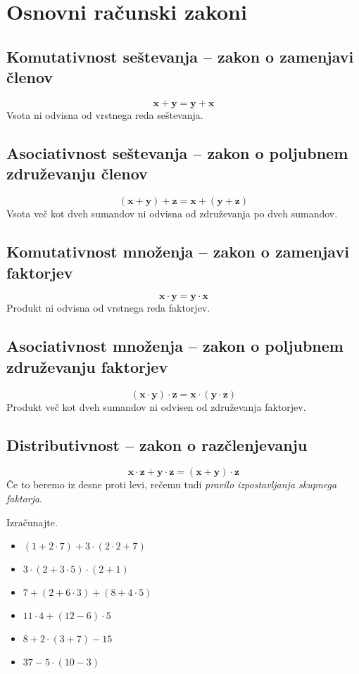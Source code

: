  

 
     \section{Osnovni računski zakoni}

     \subsection*{Komutativnost seštevanja -- zakon o zamenjavi členov}
        $$ \mathbf{x+y=y+x}$$
        Vsota ni odvisna od vrstnega reda seštevanja.
     

        \subsection*{Asociativnost seštevanja -- zakon o poljubnem združevanju členov}
        $$ \mathbf{(x+y)+z=x+(y+z)}$$
        Vsota več kot dveh sumandov ni odvisna od združevanja po dveh sumandov.
     

        \subsection*{Komutativnost množenja -- zakon o zamenjavi faktorjev}
        $$ \mathbf{x\cdot y=y\cdot x}$$
        Produkt ni odvisna od vrstnega reda faktorjev.
     

        \subsection*{Asociativnost množenja -- zakon o poljubnem združevanju faktorjev}
        $$ \mathbf{(x\cdot y)\cdot z=x\cdot (y\cdot z)}$$
        Produkt več kot dveh sumandov ni odvisen od združevanja faktorjev.
     
        \subsection*{Distributivnost -- zakon o razčlenjevanju}
        $$ \mathbf{x\cdot z+y\cdot z = (x+y)\cdot z} $$
        Če to beremo iz desne proti levi, rečemu tudi \textit{pravilo izpostavljanja skupnega faktorja}.
        \newline ~
        \newline
 

 
     \begin{naloga}
        Izračunajte.
        \begin{itemize}
            \item $(1+2\cdot 7)+3\cdot(2\cdot 2+7)$ 
            \item $3\cdot(2+3\cdot 5)\cdot(2+1)$ 
            \item $7+(2+6\cdot 3)+(8+4\cdot 5)$ 
            \item $11\cdot 4+(12-6)\cdot 5$ 
            \item $8+2\cdot(3+7)-15$ 
            \item $37-5\cdot(10-3)$ 
        \end{itemize}
     \end{naloga}
 

